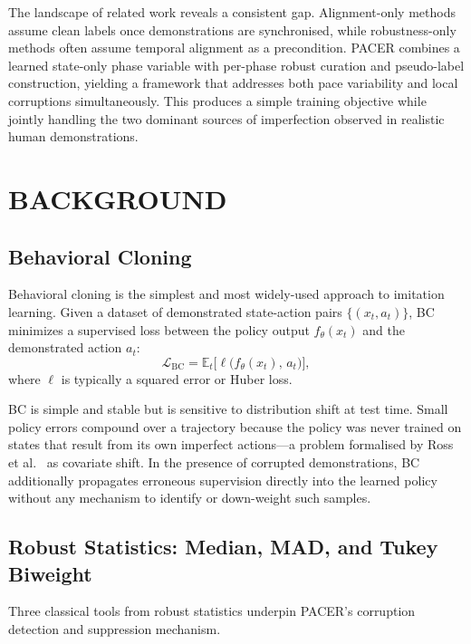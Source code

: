 \documentclass[a4paper, 10pt, conference]{ieeeconf}
\begin{document}
The landscape of related work reveals a consistent gap.
Alignment-only methods assume clean labels once demonstrations are synchronised, while robustness-only methods often assume temporal alignment as a precondition.
PACER combines a learned state-only phase variable with per-phase robust curation and pseudo-label construction, yielding a framework that addresses both pace variability and local corruptions simultaneously.
This produces a simple training objective while jointly handling the two dominant sources of imperfection observed in realistic human demonstrations.

\section{BACKGROUND}

\subsection{Behavioral Cloning}

Behavioral cloning is the simplest and most widely-used approach to imitation learning.
Given a dataset of demonstrated state-action pairs $\{(x_t, a_t)\}$, BC minimizes a supervised loss between the policy output $f_\theta(x_t)$ and the demonstrated action $a_t$:
\begin{equation}
    \mathcal{L}_{\mathrm{BC}} = \mathbb{E}_{t}\bigl[\ell\bigl(f_\theta(x_t),\, a_t\bigr)\bigr],
\end{equation}
where $\ell$ is typically a squared error or Huber loss.

BC is simple and stable but is sensitive to distribution shift at test time.
Small policy errors compound over a trajectory because the policy was never trained on states that result from its own imperfect actions---a problem formalised by Ross et al.~\cite{ross2011dagger} as covariate shift.
In the presence of corrupted demonstrations, BC additionally propagates erroneous supervision directly into the learned policy without any mechanism to identify or down-weight such samples.

\subsection{Robust Statistics: Median, MAD, and Tukey Biweight}

Three classical tools from robust statistics underpin PACER's corruption detection and suppression mechanism.
\end{document}
